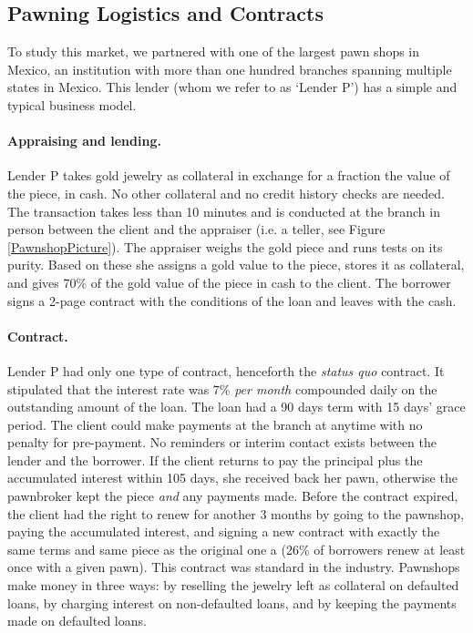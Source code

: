 \documentclass[oneside,11pt]{article}
\begin{document}
\subsection{Pawning Logistics and Contracts}

To study this market, we partnered with one of the largest pawn shops in Mexico, an institution with more than one hundred branches spanning multiple states in Mexico. This lender (whom we refer to as `Lender P') has a simple and typical business model. 

\paragraph{Appraising and lending.} Lender P takes gold jewelry as collateral in exchange for a fraction the value of the piece, in cash. No other collateral and no credit history checks are needed. The transaction takes less than 10 minutes and is conducted at the branch in person between the client and the appraiser (i.e. a teller, see Figure \ref{PawnshopPicture}). The appraiser weighs the gold piece and runs tests on its purity. Based on these she assigns a gold value to the piece, stores it as collateral, and gives 70\% of the gold value of the piece in cash to the client. The borrower signs a 2-page contract with the conditions of the loan and leaves with the cash.

\paragraph{Contract.} Lender P had only one type of contract, henceforth the \textit{status quo} contract. It stipulated that the interest rate was 7\% \textit{per month} compounded daily on the outstanding amount of the loan. The loan had a 90 days term with 15 days' grace period. The client could make payments at the branch at anytime with no penalty for pre-payment. No reminders or interim contact exists between the lender and the borrower. If the client returns to pay the principal plus the accumulated interest within 105 days, she received back her pawn, otherwise the pawnbroker kept the piece \textit{and} any payments made. Before the contract expired, the client had the right to renew for another 3 months by going to the pawnshop, paying the accumulated interest, and signing a new contract with exactly the same terms and same piece as the original one a (26\% of borrowers renew at least once with a given pawn). This contract was standard in the industry.  Pawnshops make money in three ways: by reselling the jewelry left as collateral on defaulted loans, by charging interest on non-defaulted loans, and by keeping the payments made on defaulted loans. 
\end{document}
